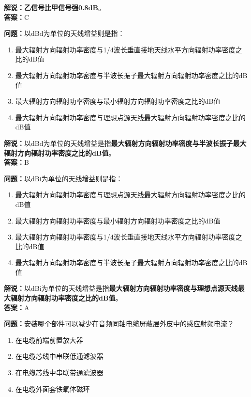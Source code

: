 \documentclass{ctexbook}
\begin{document}
\noindent\textbf{解说：乙信号比甲信号强0.8dB}。\\\noindent\textbf{答案：}C%


\bigskip


\noindent\textbf{问题：}以dBd为单位的天线增益则是指：

\begin{enumerate}[label=\Alph*), leftmargin=3em]
	\item 最大辐射方向辐射功率密度与1/4波长垂直接地天线水平方向辐射功率密度之比的dB值
	\item 最大辐射方向辐射功率密度与半波长振子最大辐射方向辐射功率密度之比的dB值
	\item 最大辐射方向辐射功率密度与最小辐射方向辐射功率密度之比的dB值
	
	\item 最大辐射方向辐射功率密度与理想点源天线最大辐射方向辐射功率密度之比的dB值
\end{enumerate}

\noindent\textbf{解说：}以dBd为单位的天线增益是指\textbf{最大辐射方向辐射功率密度与半波长振子最大辐射方向辐射功率密度之比的dB值}。\\\noindent\textbf{答案：}B


\bigskip


\noindent\textbf{问题：}以dBi为单位的天线增益则是指：
\begin{enumerate}[label=\Alph*), leftmargin=3em]
	\item 最大辐射方向辐射功率密度与理想点源天线最大辐射方向辐射功率密度之比的dB值
	\item 最大辐射方向辐射功率密度与最小辐射方向辐射功率密度之比的dB值
	\item 最大辐射方向辐射功率密度与1/4波长垂直接地天线水平方向辐射功率密度之比的dB值
	\item 最大辐射方向辐射功率密度与半波长振子最大辐射方向辐射功率密度之比的dB值
\end{enumerate}

\noindent\textbf{解说：}以dBi为单位的天线增益是指\textbf{最大辐射方向辐射功率密度与理想点源天线最大辐射方向辐射功率密度之比的dB值}。\\\noindent\textbf{答案：}A


\bigskip


\noindent\textbf{问题：}安装哪个部件可以减少在音频同轴电缆屏蔽层外皮中的感应射频电流？

\begin{enumerate}[label=\Alph*), leftmargin=3em]
	\item 在电缆前端前置放大器
	\item 在电缆芯线中串联低通滤波器
	\item 在电缆芯线中串联带通滤波器	
	\item 在电缆外面套铁氧体磁环
\end{enumerate}
\end{document}
